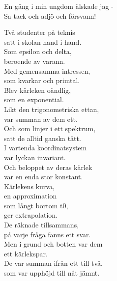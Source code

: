 \documentclass[a6paper, 10pt, twoside]{article}
\begin{document}
\begin{center}
\end{center}
\begin{lyrics}
En gång i min ungdom älskade jag - \\
Sa tack och adjö och försvann!
\end{lyrics}
\vspace{20pt}
\begin{center}
\end{center}
\begin{lyrics}
Två studenter på teknis \\
satt i skolan hand i hand. \\
Som epsilon och delta, \\
beroende av varann. \\
Med gemensamma intressen, \\
som kvarkar och primtal. \\
Blev kärleken oändlig, \\
som en exponential. 
\vspace{5pt}\\
Likt den trigonometriska ettan, \\
var summan av dem ett. \\
Och som linjer i ett spektrum, \\
satt de alltid ganska tätt. \\
I vartenda koordinatsystem \\
var lyckan invariant. \\
Och beloppet av deras kärlek \\
var en enda stor konstant. \\
\noindent
Kärlekens kurva, \\
en approximation \\
som långt bortom t0, \\
ger extrapolation. \\
De räknade tillsammans, \\
på varje fråga fanns ett svar. \\
Men i grund och botten var dem \\
ett kärlekspar.
\vspace{5pt}\\
De var summan ifrån ett till två, \\
som var upphöjd till nåt jämnt. \\

\end{lyrics}
\end{document}
